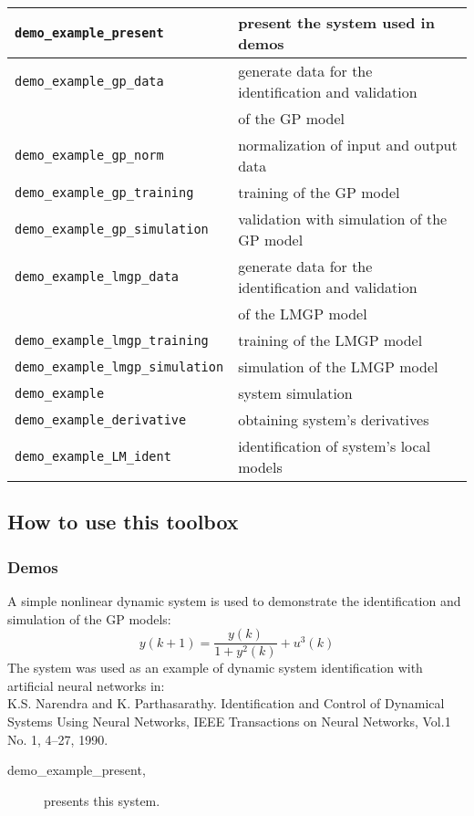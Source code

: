 \documentclass[12pt,twoside]{article}
\newcommand{\fun}[1]{{\tt {#1}}}
\begin{document}
{\begin{tabular}{|l|l|}
 \hline \fun{demo\_example\_present} & present the system used in demos  \\
 \hline \fun{demo\_example\_gp\_data} & generate data for the identification and validation  \\
 & of the GP model \\
 \hline \fun{demo\_example\_gp\_norm} & normalization of input and output data \\
 \hline \fun{demo\_example\_gp\_training} & training of the GP model \\
 \hline \fun{demo\_example\_gp\_simulation} & validation with simulation of the GP model \\
 \hline \fun{demo\_example\_lmgp\_data} & generate data for the identification and validation \\
 &  of the LMGP model \\
 \hline \fun{demo\_example\_lmgp\_training} & training of the LMGP model \\
 \hline \fun{demo\_example\_lmgp\_simulation} & simulation of the LMGP model\\
 \hline \fun{demo\_example} & system simulation\\
 \hline \fun{demo\_example\_derivative} & obtaining system's derivatives\\
 \hline \fun{demo\_example\_LM\_ident} & identification of system's local models \\ \hline

\end{tabular}


} %


\clearpage


\subsection{How to use this toolbox}


\subsubsection{Demos}

A simple nonlinear dynamic system is used to demonstrate the
identification and simulation of the GP models:
 \begin{equation}
 y(k+1) = \frac{y(k)}{1+y^2(k)} + u^3(k) \label{eq:narendra}
 \end{equation}
 The system was used as an example of dynamic system identification
 with artificial neural networks in: \\
 K.S. Narendra and K. Parthasarathy. Identification
 and Control of Dynamical Systems Using Neural Networks,
 IEEE Transactions on Neural Networks, Vol.1 No. 1, 4--27, 1990.
 \begin{description}
 \item [demo\_example\_present,] presents this
 system.
 \end{description}
\end{document}
